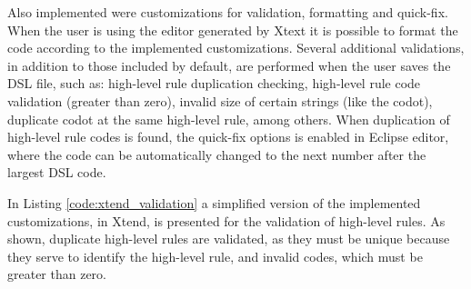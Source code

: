 \documentclass[AMA,STIX1COL,hidelinks]{WileyNJD-v2}
\begin{document}

Also implemented were customizations for validation, formatting and quick-fix. When the user is using the editor generated by Xtext it is possible to format the code according to the implemented customizations. Several additional validations, in addition to those included by default, are performed when the user saves the DSL file, such as: high-level rule duplication checking, high-level rule code validation (greater than zero), invalid size of certain strings (like the codot), duplicate codot at the same high-level rule, among others. When duplication of high-level rule codes is found, the quick-fix options is enabled in Eclipse editor, where the code can be automatically changed to the next number after the largest DSL code.



In Listing \ref{code:xtend_validation} a simplified version of the implemented customizations, in Xtend, is presented for the validation of high-level rules. %
As shown, duplicate high-level rules are validated, as they must be unique because they serve to identify the high-level rule, and invalid codes, which must be greater than zero.
\end{document}
